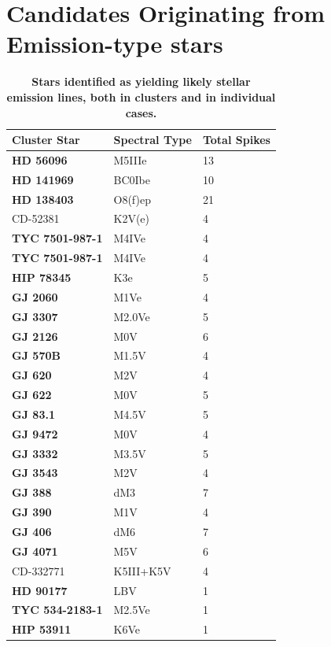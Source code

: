 \documentclass[linenumbers]{aastex701}
\providecommand{\DIFadd}[1]{{\bf #1}} %
\providecommand{\DIFaddbegin}{} %
\providecommand{\DIFaddFL}[1]{\DIFadd{#1}} %
\providecommand{\DIFaddbeginFL}{} %
\providecommand{\DIFaddendFL}{} %
\begin{document}
\section{Candidates Originating from  Emission-type stars}
\label{s:confirmedstellaremissionclusters}
 \DIFaddbegin \begin{table}[htbp]
\centering
\label{t:emissionstars}
\DIFaddendFL \begin{tabular}{|l|l|l|} 
 \hline
 Cluster Star & Spectral Type & Total Spikes \\ 
 \hline
  \DIFaddbeginFL \DIFaddFL{HD 56096 }\DIFaddendFL & M5IIIe & 13 \\ 
  \DIFaddbeginFL \DIFaddFL{HD 141969 }\DIFaddendFL & BC0Ibe & 10 \\ 
  \DIFaddbeginFL \DIFaddFL{HD 138403 }\DIFaddendFL & O8(f)ep & 21 \\ 
 CD-52381 & K2V(e) & 4 \\
  \DIFaddbeginFL \DIFaddFL{TYC 7501-987-1 }\DIFaddendFL & M4IVe & 4 \\
  \DIFaddbeginFL \DIFaddFL{TYC 7501-987-1 }\DIFaddendFL & M4IVe & 4 \\
  \DIFaddbeginFL \DIFaddFL{HIP 78345 }\DIFaddendFL & K3e & 5 \\
  \DIFaddbeginFL \DIFaddFL{GJ 2060 }\DIFaddendFL & M1Ve & 4 \\
  \DIFaddbeginFL \DIFaddFL{GJ 3307 }\DIFaddendFL & M2.0Ve & 5 \\
  \DIFaddbeginFL \DIFaddFL{GJ 2126 }\DIFaddendFL & M0V & 6 \\
  \DIFaddbeginFL \DIFaddFL{GJ 570B }\DIFaddendFL & M1.5V & 4 \\
  \DIFaddbeginFL \DIFaddFL{GJ 620 }\DIFaddendFL & M2V & 4 \\
  \DIFaddbeginFL \DIFaddFL{GJ 622 }\DIFaddendFL & M0V & 5 \\
  \DIFaddbeginFL \DIFaddFL{GJ 83.1 }\DIFaddendFL & M4.5V & 5 \\
  \DIFaddbeginFL \DIFaddFL{GJ 9472 }\DIFaddendFL & M0V & 4 \\
  \DIFaddbeginFL \DIFaddFL{GJ 3332 }\DIFaddendFL & M3.5V & 5 \\
  \DIFaddbeginFL \DIFaddFL{GJ 3543 }\DIFaddendFL & M2V & 4 \\
  \DIFaddbeginFL \DIFaddFL{GJ 388 }\DIFaddendFL & dM3 & 7 \\
  \DIFaddbeginFL \DIFaddFL{GJ 390 }\DIFaddendFL & M1V & 4 \\
  \DIFaddbeginFL \DIFaddFL{GJ 406 }\DIFaddendFL & dM6 & 7 \\
  \DIFaddbeginFL \DIFaddFL{GJ 4071 }\DIFaddendFL & M5V & 6 \\
 CD-332771 & K5III+K5V & 4 \\
  \DIFaddbeginFL \DIFaddFL{HD 90177 }\DIFaddendFL & LBV & 1 \\
  \DIFaddbeginFL \DIFaddFL{TYC 534-2183-1 }\DIFaddendFL & M2.5Ve & 1 \\
  \DIFaddbeginFL \DIFaddFL{HIP 53911 }\DIFaddendFL & K6Ve & 1 \\
\hline
\end{tabular}
  \DIFaddbeginFL \caption{\DIFaddFL{Stars identified as yielding likely stellar emission lines, both in clusters and in individual cases.}}
\end{table}
\end{document}
